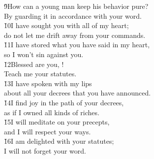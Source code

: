 \begin{poetry}
\poeml \v{9}How can a young man keep his behavior pure? \\
\poemll    By guarding it in accordance with your word. \\
\poeml \v{10}I have sought you with all of my heart; \\
\poemll    do not let me drift away from your commands. \\
\poeml \v{11}I have stored what you have said in my heart, \\
\poemll    so I won't sin against you. \\
\poeml \v{12}Blessed are you, ! \\
\poemll    Teach me your statutes. \\
\poeml \v{13}I have spoken with my lips \\
\poemll    about all your decrees that you have announced. \\
\poeml \v{14}I find joy in the path of your decrees, \\
\poemll    as if I owned all kinds of riches. \\
\poeml \v{15}I will meditate on your precepts, \\
\poemll    and I will respect your ways. \\
\poeml \v{16}I am delighted with your statutes; \\
\poemll    I will not forget your word.
\end{poetry}


